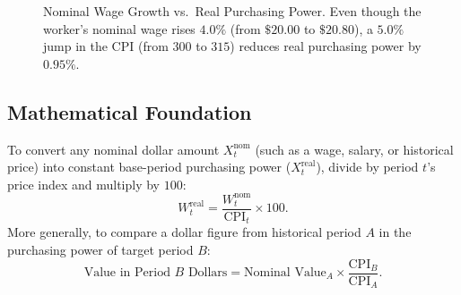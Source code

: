 \documentclass[11pt,letterpaper]{article}
\begin{document}
\begin{figure}[htbp]
\caption{Nominal Wage Growth vs.\ Real Purchasing Power. Even though the worker's nominal wage rises $4.0\%$ (from $\$20.00$ to $\$20.80$), a $5.0\%$ jump in the CPI (from $300$ to $315$) reduces real purchasing power by $0.95\%$.}
\label{fig:nominal_vs_real_wage}
\end{figure}

\subsection*{Mathematical Foundation}
To convert any nominal dollar amount $X_t^{\text{nom}}$ (such as a wage, salary, or historical price) into constant base-period purchasing power ($X_t^{\text{real}}$), divide by period $t$'s price index and multiply by $100$:
\begin{equation}
W_t^{\text{real}} = \frac{W_t^{\text{nom}}}{\text{CPI}_t} \times 100.
\end{equation}
More generally, to compare a dollar figure from historical period $A$ in the purchasing power of target period $B$:
\begin{equation}
\text{Value in Period } B \text{ Dollars} = \text{Nominal Value}_A \times \frac{\text{CPI}_B}{\text{CPI}_A}.
\end{equation}
\end{document}
